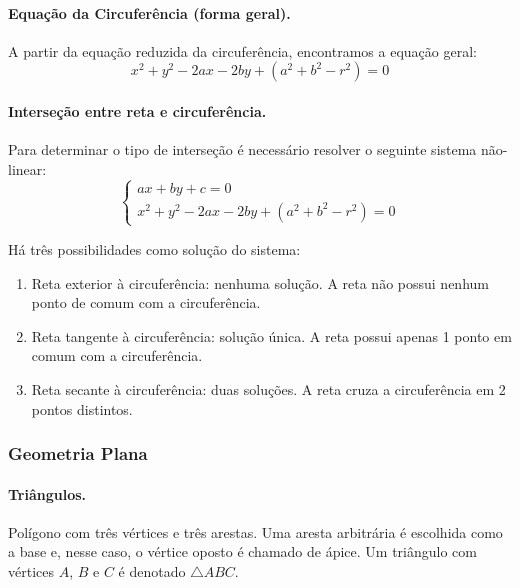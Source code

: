 \paragraph{Equação da Circuferência (forma geral).} A partir da equação reduzida da circuferência, encontramos a equação geral:
		$$x^2 +y^2-2ax-2by+(a^2+b^2-r^2)=0$$

\paragraph{Interseção entre reta e circuferência.} Para determinar o tipo de interseção é necessário resolver o seguinte sistema não-linear: 
$$
\begin{cases}
	ax+by+c = 0 \\
	x^2 +y^2-2ax-2by+(a^2+b^2-r^2)=0
\end{cases}
$$

Há três possibilidades como solução do sistema:
		\begin{enumerate}
			\item Reta exterior à circuferência: nenhuma solução. A reta não possui nenhum ponto de comum com a circuferência.
			\item Reta tangente à circuferência: solução única. A reta possui apenas 1 ponto em comum com a circuferência.
			\item Reta secante à circuferência: duas soluções. A reta cruza a circuferência em 2 pontos distintos.
		\end{enumerate}

\subsubsection{Geometria Plana}

\paragraph{Triângulos.} Polígono com três vértices e três arestas. Uma aresta arbitrária é escolhida como a base e, nesse caso, o vértice oposto é chamado de ápice. Um triângulo com vértices $A$, $B$ e $C$ é denotado $\triangle ABC$.

